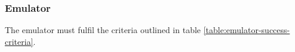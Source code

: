     \subsubsection{Emulator}
        The emulator must fulfil the criteria outlined in table \ref{table:emulator-success-criteria}.

